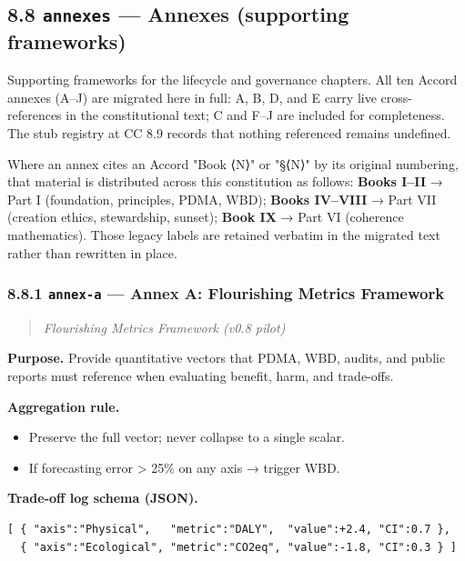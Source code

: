 \documentclass[11pt]{article}
\begin{document}
\subsection*{8.8 \texttt{annexes} — Annexes (supporting frameworks)}


Supporting frameworks for the lifecycle and governance chapters. All ten Accord annexes (A–J) are migrated here in full: A, B, D, and E carry live cross-references in the constitutional text; C and F–J are included for completeness. The stub registry at CC 8.9 records that nothing referenced remains undefined.


Where an annex cites an Accord "Book ⟨N⟩" or "§⟨N⟩" by its original numbering, that material is distributed across this constitution as follows: \textbf{Books I–II} → Part I (foundation, principles, PDMA, WBD); \textbf{Books IV–VIII} → Part VII (creation ethics, stewardship, sunset); \textbf{Book IX} → Part VI (coherence mathematics). Those legacy labels are retained verbatim in the migrated text rather than rewritten in place.


\subsubsection*{8.8.1 \texttt{annex-a} — Annex A: Flourishing Metrics Framework}


\begin{quote}\itshape Flourishing Metrics Framework (v0.8 pilot)\end{quote}


\textbf{Purpose.} Provide quantitative vectors that PDMA, WBD, audits, and public reports must reference when evaluating benefit, harm, and trade-offs.


\textbf{Aggregation rule.}

\begin{itemize}\setlength\itemsep{0pt}
\item Preserve the full vector; never collapse to a single scalar.
\item If forecasting error > 25\% on any axis → trigger WBD.
\end{itemize}


\textbf{Trade-off log schema (JSON).}


\begin{lstlisting}
[ { "axis":"Physical",   "metric":"DALY",  "value":+2.4, "CI":0.7 },
  { "axis":"Ecological", "metric":"CO2eq", "value":-1.8, "CI":0.3 } ]
\end{lstlisting}
\end{document}
